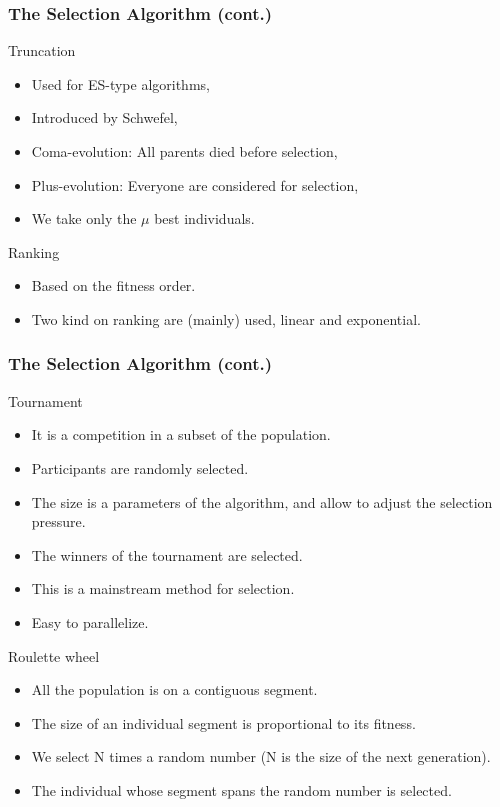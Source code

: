\begin{frame}
  \frametitle{The Selection Algorithm (cont.)}
  \begin{block}{Truncation}
    \begin{itemize}
    \item Used for ES-type algorithms,
    \item Introduced by Schwefel\cite{schwefel1995},
    \item Coma-evolution: All parents died before selection,
    \item Plus-evolution: Everyone are considered for selection,
    \item We take only the $\mu$ best individuals.
    \end{itemize}
  \end{block}

  \begin{block}{Ranking}
    \begin{itemize}
    \item Based on the fitness order.
    \item Two kind on ranking are (mainly) used, linear and exponential.
    \end{itemize}
  \end{block}
\end{frame}

\begin{frame}
  \frametitle{The Selection Algorithm (cont.)}
  \begin{block}{Tournament}
    \begin{itemize}
    \item It is a competition in a subset of the population.
    \item Participants are randomly selected.
    \item The size is a parameters of the algorithm, and allow to
      adjust the selection pressure.
    \item The winners of the tournament are selected.
    \item This is a mainstream method for selection.
    \item Easy to parallelize.
    \end{itemize}
  \end{block}

  \begin{block}{Roulette wheel}
    \begin{itemize}
    \item All the population is on a contiguous segment.
    \item The size of an individual segment is proportional to its fitness.
    \item We select N times a random number (N is the size of the
      next generation).
    \item The individual whose segment spans the random number is selected.
    \end{itemize}
  \end{block}
\end{frame}


